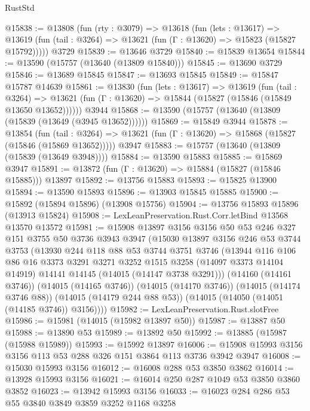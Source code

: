 \begin{lexlean}{RustStd}
\begin{coremodule}
@15838 := @13808
    (fun (rty : @3079) =>
    @13618
      (fun (lets : @13617) =>
      @13619 (fun (tail : @3264) => @13621 (fun (Γ : @13620) => @15823 (@15827 @15792)))))
    @3729
@15839 := @13646 @3729
@15840 := @15839 @13654
@15844 := @13590 (@15757 (@13640 (@13809 @15840)))
@15845 := @13690 @3729
@15846 := @13689 @15845
@15847 := @13693 @15845
@15849 := @15847 @15787 @14639
@15861 := @13830
    (fun (lets : @13617) =>
    @13619
      (fun (tail : @3264) =>
      @13621 (fun (Γ : @13620) => @15844 (@15827 (@15846 (@15849 @13650 @13652))))))
    @3944
@15868 := @13590 (@15757 (@13640 (@13809 (@15839 (@13649 (@3945 @13652))))))
@15869 := @15849 @3944
@15878 := @13854
    (fun (tail : @3264) => @13621 (fun (Γ : @13620) => @15868 (@15827 (@15846 (@15869 @13652)))))
    @3947
@15883 := @15757 (@13640 (@13809 (@15839 (@13649 @3948))))
@15884 := @13590 @15883
@15885 := @15869 @3947
@15891 := @13872 (fun (Γ : @13620) => @15884 (@15827 (@15846 @15885))) @13897
@15892 := @13756 @15883
@15893 := @15825 @13900
@15894 := @13590 @15893
@15896 := @13903 @15845 @15885
@15900 := @15892 (@15894 @15896) (@13908 @15756)
@15904 := @13756 @15893 @15896 (@13913 @15824)
@15908 := LexLeanPreservation.Rust.Corr.letBind @13568 @13570 @13572
@15981 := @15908
    @13897
    @3156
    @3156
    @50
    @53
    @246
    @327
    @151
    @3755
    @50
    @3736
    @3943
    @3947
    (@15030
      @13897
      @3156
      @246
      @53
      @3744
      @3753
      (@13930
        @244
        @118
        @88
        @53
        @3744
        @3751
        @3746
        (@13944
          @116
          @106
          @86
          @16
          @3373
          @3291
          @3271
          @3252
          @1515
          @3258
          (@14097 @3373 @14104 @14919)
          @14141
          @14145
          (@14015 (@14147 @3738 @3291)))
        (@14160 (@14161 @3746))
        (@14015 (@14165 @3746))
        (@14015 (@14170 @3746))
        (@14015 (@14174 @3746 @88))
        (@14015 (@14179 @244 @88 @53))
        (@14015 (@14050 (@14051 (@14185 @3746)) @3156))))
@15982 := LexLeanPreservation.Rust.slotFree
@15986 := @15981 (@14015 (@15982 @13897 @50))
@15987 := @13887 @50
@15988 := @13890 @53
@15989 := @13892 @50
@15992 := @13885 (@15987 (@15988 @15989))
@15993 := @15992 @13897
@16006 := @15908 @15993 @3156 @3156 @113 @53 @288 @326 @151 @3864 @113 @3736 @3942 @3947
@16008 := @15030 @15993 @3156
@16012 := @16008 @288 @53 @3850 @3862
@16014 := @13928 @15993 @3156
@16021 := @16014 @250 @287 @1049 @53 @3850 @3860 @3852
@16023 := @13942 @15993 @3156
@16033 := @16023 @284 @286 @53 @55 @3840 @3849 @3859 @3252 @1168 @3258

\end{coremodule}
\end{lexlean}
